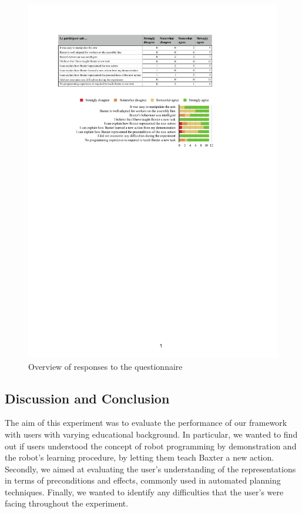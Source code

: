 \begin{figure}[ht]
	\centering
	\includegraphics[scale=1]{figures/eEvaluation}
	\caption{Overview of responses to the questionnaire}
	\label{fig:eEvaluation}
\end{figure}



\subsection{Discussion and Conclusion}

The aim of this experiment was to evaluate the performance of our framework with users with varying educational background. In particular, we wanted to find out if users understood the concept of robot programming by demonstration and the robot's learning procedure, by letting them teach Baxter a new action. Secondly, we aimed at evaluating the user's understanding of the representations in terms of preconditions and effects, commonly used in automated planning techniques. Finally, we wanted to identify any difficulties that the user's were facing throughout the experiment.


